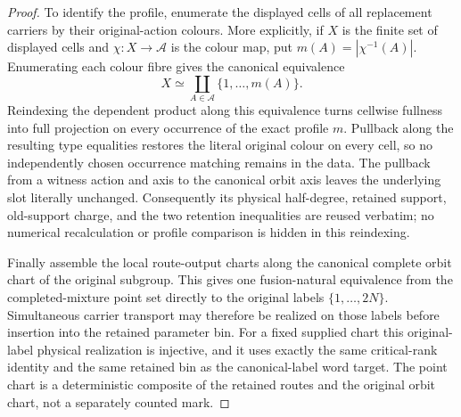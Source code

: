 \begin{proof}
To identify the profile, enumerate the displayed cells of all replacement
carriers by their original-action colours.  More explicitly, if $X$ is the
finite set of displayed cells and $\chi:X\to\mathcal A$ is the colour map,
put $m(A)=|\chi^{-1}(A)|$.  Enumerating each colour fibre gives the canonical
equivalence
\[
 X\simeq\coprod_{A\in\mathcal A}\{1,\ldots,m(A)\}.
\]
Reindexing the dependent product along this equivalence turns cellwise
fullness into full projection on every occurrence of the exact profile
$m$.  Pullback along the resulting type equalities restores the literal
original colour on every cell, so no independently chosen occurrence
matching remains in the data.  The pullback from a witness action and axis
to the canonical orbit axis leaves the underlying slot literally unchanged.
Consequently its physical half-degree, retained support, old-support charge,
and the two retention inequalities are reused verbatim; no numerical
recalculation or profile comparison is hidden in this reindexing.

Finally assemble the local route-output charts along the canonical complete
orbit chart of the original subgroup.  This gives one fusion-natural
equivalence from the completed-mixture point set directly to the original
labels $\{1,\ldots,2N\}$.  Simultaneous carrier transport may therefore be
realized on those labels before insertion into the retained parameter bin.
For a fixed supplied chart this original-label physical realization is
injective, and it uses exactly the same critical-rank identity and the same
retained bin as the canonical-label word target.  The point chart is a
deterministic composite of the retained routes and the original orbit chart,
not a separately counted mark.


\end{proof}
